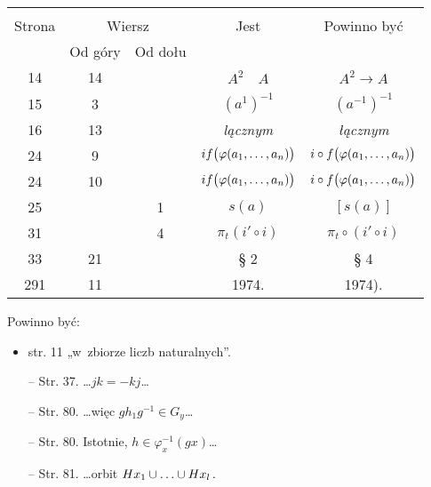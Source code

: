 \documentclass[a4paper,11pt]{article}
\begin{document}
\begin{center}
  \begin{tabular}{|c|c|c|c|c|}
    \hline
    & \multicolumn{2}{c|}{} & & \\
    Strona & \multicolumn{2}{c|}{Wiersz} & Jest
                              & Powinno być \\ \cline{2-3}
    & Od góry & Od dołu & & \\
    \hline
    14 & 14 & & $A^{ 2 } \quad A$ & $A^{ 2 } \to A$ \\
    15 & 3 & & $( a^{ 1 } )^{ -1 }$ & $( a^{ -1 } )^{ -1 }$ \\
    16 & 13 & & \emph{lącznym} & \emph{łącznym} \\
    24 & 9 & & $if\big( \varphi( a_{ 1 }, \ldots, a_{ n } ) \big)$
           & $i \circ f\big( \varphi( a_{ 1 }, \ldots, a_{ n } ) \big)$ \\
    24 & 10 & & $if\big( \varphi( a_{ 1 }, \ldots, a_{ n } ) \big)$
           & $i \circ f\big( \varphi( a_{ 1 }, \ldots, a_{ n } ) \big)$ \\
    25 & & 1 & $s( a )$ & $[ s( a ) ]$ \\
    31 & & 4 & $\pi_{ t }( i' \circ i )$
           & $\pi_{ t } \circ ( i' \circ i )$ \\
    33 & 21 & & \S{} 2 & \S{} 4 \\
    291 & 11 & & 1974. & 1974). \\
    \hline
  \end{tabular}
\end{center}

Powinno być:
\begin{itemize}
  \item str. 11 „w~zbiorze liczb naturalnych”.
\item[--] Str. 37. \ldots$j k = -k j$\ldots
\item[--] Str. 80. \ldots więc $g h_{ 1 } g^{ -1 } \in G_{ y }$\ldots
\item[--] Str. 80. Istotnie, $h \in \varphi_{ x }^{ -1 }( g x )$\ldots
\item[--] Str. 81. \ldots orbit
  $H x_{ 1 } \cup \ldots \cup H x_{ l } \, .$
\end{itemize}
\end{document}
